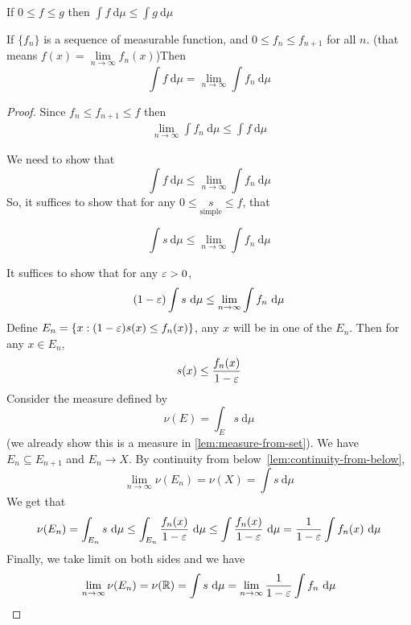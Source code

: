 \begin{remark}
  If $0 \le f \leq g$ then $\int f \ \mathrm{d}\mu \leq \int g \ \mathrm{d}\mu$
\end{remark}

\begin{theorem}
  If $\{f_n\}$ is a sequence of measurable function, and $0 \le f_n \le f_{n+1}$ for all $n$. 
  (that means $f(x) = \lim\limits_{n\to\infty}f_n(x)$)Then
  \[\int f\ \mathrm{d}\mu = \lim_{n\to\infty}\int f_n\ \mathrm{d}\mu\]
\end{theorem}

\begin{proof}

  Since $f_n \le f_{n+1} \le f$ then 
  \begin{align*}
    \lim_{n\to\infty}\int f_n\ \mathrm{d}\mu \le \int f\ \mathrm{d}\mu
  \end{align*}

  We need to show that $$\int f \ \mathrm{d}\mu\le \lim\limits_{n\to\infty} \int f_n\ \mathrm{d}\mu$$
  So, it suffices to show that for any $0 \le \underset{\text{simple}}s \le f$, that 

  $$\int s\ \mathrm{d}\mu \le \lim\limits_{n\to\infty} \int f_n\ \mathrm{d}\mu$$

  It suffices to show that for any $\varepsilon > 0$, 
  $$(1-\varepsilon)\int s\ \mathrm{d}\mu \le \lim_{n\to\infty} \int f_n\ \mathrm{d}\mu$$
  Define $E_n = \{x : (1 - \varepsilon)s(x) \le f_n(x)\}$, any $x$ will be in one of the $E_n$.
  Then for any $x \in E_n$, 
  $$s(x) \le \frac{f_n(x)}{1-\varepsilon}$$
  Consider the measure defined by $$\nu(E) = \int_E s\ \mathrm{d}\mu$$ (we already show this is a measure in \ref{lem:measure-from-set}).
  We have $E_n \subseteq E_{n+1}$ and $E_n \to X$. By continuity from below~\ref{lem:continuity-from-below}, 
  $$\lim\limits_{n\to\infty}\nu(E_n) = \nu(X) = \int s\ \mathrm{d}\mu$$
  We get that
  $$\nu(E_n) = \int_{E_n} s\ \mathrm{d}\mu \le \int_{E_n} \frac{f_n(x)}{1-\eps}\ \mathrm{d}\mu \leq \int\frac{f_n(x)}{1-\eps}\ \mathrm{d}\mu = \frac1{1-\eps}\int f_n(x)\ \mathrm{d}\mu$$
  Finally, we take limit on both sides and we have 
  $$\lim_{n\to\infty}\nu(E_n) = \nu(\RR) = \int s\ \mathrm{d}\mu = \lim_{n\to\infty} \frac1{1-\eps} \int f_n\ \mathrm{d}\mu$$
\end{proof}

